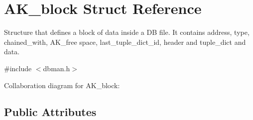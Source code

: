\hypertarget{structAK__block}{\section{A\+K\+\_\+block Struct Reference}
\label{structAK__block}
}


Structure that defines a block of data inside a D\+B file. It contains address, type, chained\+\_\+with, A\+K\+\_\+free space, last\+\_\+tuple\+\_\+dict\+\_\+id, header and tuple\+\_\+dict and data.  




{\ttfamily \#include $<$dbman.\+h$>$}



Collaboration diagram for A\+K\+\_\+block\+:
\subsection*{Public Attributes}
